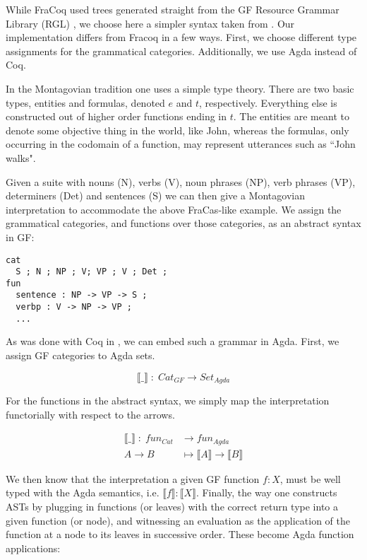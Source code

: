 \documentclass[a4paper, 11pt]{article}
\begin{document}
While FraCoq used trees generated straight from the GF Resource Grammar Library (RGL)
\cite{ljunglof2012bilingual}, we choose here a simpler syntax taken from
\cite{nassli}. Our implementation differs from Fracoq in a few ways. First, we
choose different type assignments for the grammatical categories. Additionally,
we use Agda instead of Coq.

In the Montagovian tradition one uses a simple type theory. There are two basic
types, entities and formulas, denoted $e$ and $t$, respectively. Everything else
is constructed out of higher order functions ending in $t$. The entities are
meant to denote some objective thing in the world, like John, whereas the
formulas, only occurring in the codomain of a function, may represent utterances
such as ``John walks".

Given a suite with nouns (N), verbs (V), noun phrases (NP), verb phrases (VP),
determiners (Det) and sentences (S) we can then give a Montagovian
interpretation to accommodate the above FraCas-like example. We assign the
grammatical categories, and functions over those categories, as an abstract
syntax in GF:

\begin{verbatim}
cat
  S ; N ; NP ; V; VP ; V ; Det ;
fun
  sentence : NP -> VP -> S ;
  verbp : V -> NP -> VP ;
  ...
\end{verbatim}

As was done with Coq in \cite{fracoq}, we can embed such a grammar in Agda.
First, we assign GF categories to Agda sets.

$$\llbracket\_\rrbracket\; {:}\; Cat_{GF} \rightarrow Set_{Agda}$$

For the functions in the abstract syntax, we simply map the interpretation
functorially with respect to the arrows.

\begin{align*}
  \llbracket\_\rrbracket\; {:}\; fun_{Cat} &\longrightarrow fun_{Agda}\\
  A \rightarrow B &\mapsto \llbracket A \rrbracket \rightarrow \llbracket B \rrbracket
\end{align*}

We then know that the interpretation a given GF function $f {:} X$, must be well
typed with the Agda semantics, i.e. $\llbracket f \rrbracket {:} \llbracket X
\rrbracket$. Finally, the way one constructs ASTs by plugging in functions (or
leaves) with the correct return type into a given function (or node), and
witnessing an evaluation as the application of the function at a node to its
leaves in successive order. These become Agda function applications:
\end{document}
